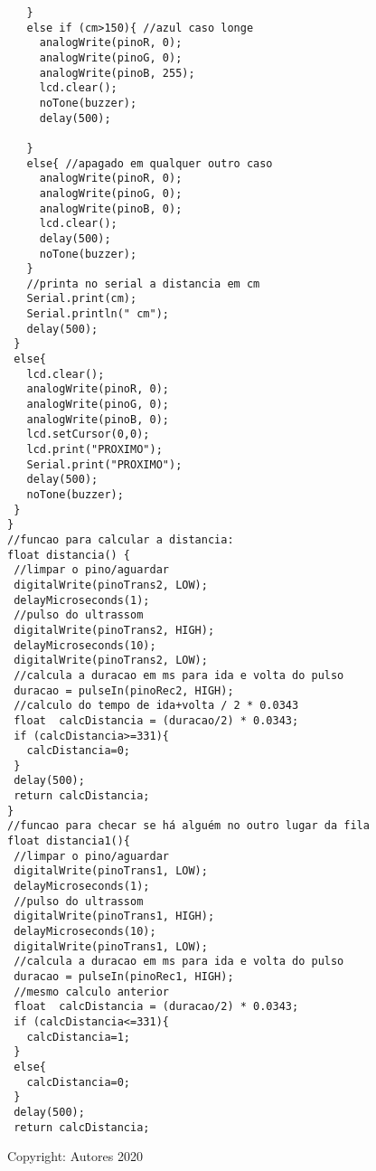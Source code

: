 \documentclass[10pt,twocolumn,letterpaper]{article}
\begin{document}
\begin{lstlisting}
   }
   else if (cm>150){ //azul caso longe
     analogWrite(pinoR, 0);
     analogWrite(pinoG, 0);
     analogWrite(pinoB, 255);
     lcd.clear();
     noTone(buzzer);
     delay(500);
    
   }
   else{ //apagado em qualquer outro caso
     analogWrite(pinoR, 0);
     analogWrite(pinoG, 0);
     analogWrite(pinoB, 0);
     lcd.clear();
     delay(500);
     noTone(buzzer);
   }
   //printa no serial a distancia em cm
   Serial.print(cm);
   Serial.println(" cm");
   delay(500);
 }
 else{
   lcd.clear();
   analogWrite(pinoR, 0);
   analogWrite(pinoG, 0);
   analogWrite(pinoB, 0);
   lcd.setCursor(0,0);
   lcd.print("PROXIMO");
   Serial.print("PROXIMO");
   delay(500);
   noTone(buzzer);
 }
}
//funcao para calcular a distancia:
float distancia() {
 //limpar o pino/aguardar
 digitalWrite(pinoTrans2, LOW);
 delayMicroseconds(1);
 //pulso do ultrassom
 digitalWrite(pinoTrans2, HIGH);
 delayMicroseconds(10);
 digitalWrite(pinoTrans2, LOW);
 //calcula a duracao em ms para ida e volta do pulso
 duracao = pulseIn(pinoRec2, HIGH);
 //calculo do tempo de ida+volta / 2 * 0.0343
 float  calcDistancia = (duracao/2) * 0.0343;
 if (calcDistancia>=331){
   calcDistancia=0;
 }
 delay(500);
 return calcDistancia;
}
//funcao para checar se há alguém no outro lugar da fila
float distancia1(){
 //limpar o pino/aguardar
 digitalWrite(pinoTrans1, LOW);
 delayMicroseconds(1);
 //pulso do ultrassom
 digitalWrite(pinoTrans1, HIGH);
 delayMicroseconds(10);
 digitalWrite(pinoTrans1, LOW);
 //calcula a duracao em ms para ida e volta do pulso
 duracao = pulseIn(pinoRec1, HIGH);
 //mesmo calculo anterior
 float  calcDistancia = (duracao/2) * 0.0343;
 if (calcDistancia<=331){
   calcDistancia=1;
 }
 else{
   calcDistancia=0;
 }
 delay(500);
 return calcDistancia;

\end{lstlisting}
Copyright: Autores 2020
\end{document}
